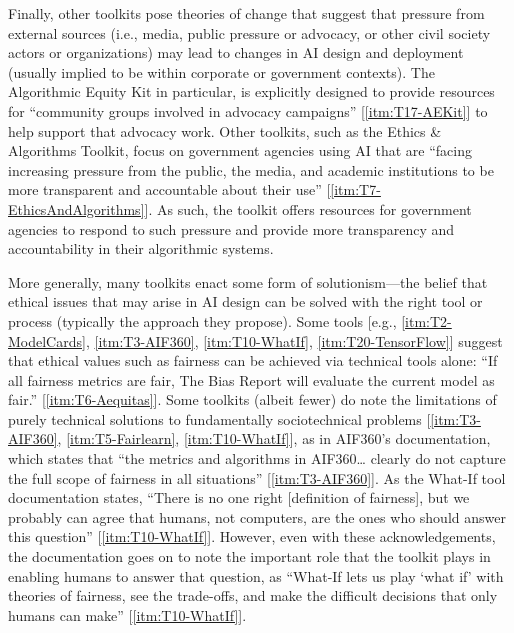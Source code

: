 \documentclass[acmsmall]{acmart}
\begin{document}
Finally, other toolkits pose theories of change that suggest that pressure from external sources (i.e., media, public pressure or advocacy, or other civil society actors or organizations) may lead to changes in AI design and deployment (usually implied to be within corporate or government contexts). The Algorithmic Equity Kit in particular, is explicitly designed to provide resources for ``community groups involved in advocacy campaigns'' [\ref{itm:T17-AEKit}] to help support that advocacy work. Other toolkits, such as the Ethics \& Algorithms Toolkit, focus on government agencies using AI that are ``facing increasing pressure from the public, the media, and academic institutions to be more transparent and accountable about their use'' [\ref{itm:T7-EthicsAndAlgorithms}]. As such, the toolkit offers resources for government agencies to respond to such pressure and provide more transparency and accountability in their algorithmic systems.
 
More generally, many toolkits enact some form of solutionism---the belief that ethical issues that may arise in AI design can be solved with the right tool or process (typically the approach they propose). 
Some tools [e.g., \ref{itm:T2-ModelCards}, \ref{itm:T3-AIF360}, \ref{itm:T10-WhatIf}, \ref{itm:T20-TensorFlow}] suggest that ethical values such as fairness can be achieved via technical tools alone:
``If all fairness metrics are fair, The Bias Report will evaluate the current model as fair.'' [\ref{itm:T6-Aequitas}].
Some toolkits (albeit fewer) do note the limitations of purely technical solutions to fundamentally sociotechnical problems [\ref{itm:T3-AIF360}, \ref{itm:T5-Fairlearn}, \ref{itm:T10-WhatIf}], as in AIF360’s documentation, which states that ``the metrics and algorithms in AIF360… clearly do not capture the full scope of fairness in all situations'' [\ref{itm:T3-AIF360}]. As the What-If tool documentation states, ``There is no one right [definition of fairness], but we probably can agree that humans, not computers, are the ones who should answer this question'' [\ref{itm:T10-WhatIf}]. 
However, even with these acknowledgements, the documentation goes on to note the important role that the toolkit plays in enabling humans to answer that question, as ``What-If lets us play `what if' with theories of fairness, see the trade-offs, and make the difficult decisions that only humans can make'' [\ref{itm:T10-WhatIf}].
 
\end{document}
